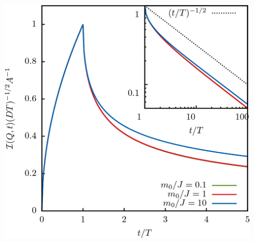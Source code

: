 \documentclass{beamer}
\begin{document}
\begin{frame}
{{\begin{columns}
\begin{column}{0.45\textwidth}
\begin{center}
     \includegraphics[width=\textwidth,height=.5\textheight]{impact}
     \end{center}
\end{column}
\end{columns}

}
}
\end{frame}
\end{document}
